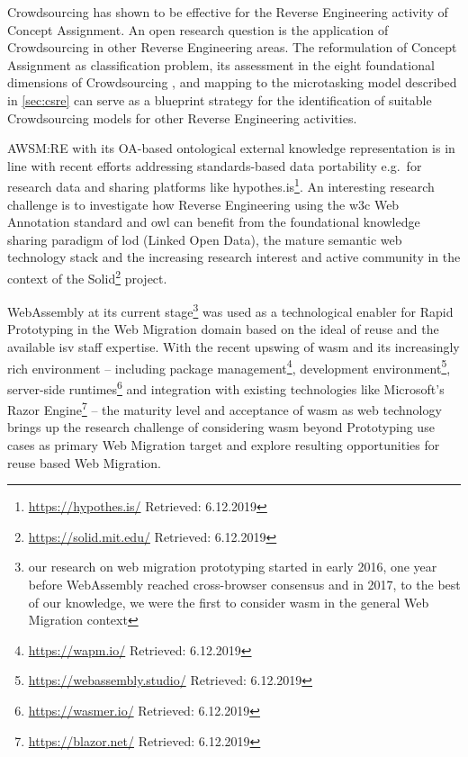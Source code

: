 \gls{Crowdsourcing} has shown to be effective for the \gls{Reverse Engineering} activity of \gls{Concept Assignment}.
An open research question is the application of \gls{Crowdsourcing} in other \gls{Reverse Engineering} areas.
The reformulation of \gls{Concept Assignment} as classification problem, its assessment in the eight foundational dimensions of \gls{Crowdsourcing} \autocite{Latoza2016}, and mapping to the microtasking model described in \cref{sec:csre} can serve as a blueprint strategy for the identification of suitable \gls{Crowdsourcing} models for other \gls{Reverse Engineering} activities.

AWSM:RE with its OA-based ontological external knowledge representation is in line with recent efforts addressing standards-based data portability e.g.~for research data \autocite{Diaz2019OpenAnnotationInSLRs} and sharing platforms like hypothes.is\footnote{\url{https://hypothes.is/} Retrieved: 6.12.2019}.
An interesting research challenge is to investigate how \gls{Reverse Engineering} using the \gls{w3c} Web Annotation standard and \gls{owl} can benefit from the foundational knowledge sharing paradigm of \gls{lod} (Linked Open Data), the mature semantic \gls{web} technology stack and the increasing research interest and active community in the context of the Solid\footnote{\url{https://solid.mit.edu/} Retrieved: 6.12.2019} project.

WebAssembly at its current stage\footnote{our research on web migration prototyping started in early 2016, one year before WebAssembly reached cross-browser consensus and in 2017, to the best of our knowledge, we were the first to consider \gls{wasm} in the general \gls{Web Migration} context} was used as a technological enabler for \gls{Rapid Prototyping} in the \gls{Web Migration} domain based on the ideal of reuse and the available \gls{isv} staff expertise.
With the recent upswing of \gls{wasm} and its increasingly rich environment -- including package management\footnote{\url{https://wapm.io/} Retrieved: 6.12.2019}, development environment\footnote{\url{https://webassembly.studio/} Retrieved: 6.12.2019}, server-side runtimes\footnote{\url{https://wasmer.io/} Retrieved: 6.12.2019} and integration with existing technologies like Microsoft's Razor Engine\footnote{\url{https://blazor.net/} Retrieved: 6.12.2019} -- the maturity level and acceptance of \gls{wasm} as \gls{web} technology brings up the research challenge of considering \gls{wasm} beyond \gls{Prototyping} use cases as primary \gls{Web Migration} target and explore resulting opportunities for reuse based \gls{Web Migration}.

